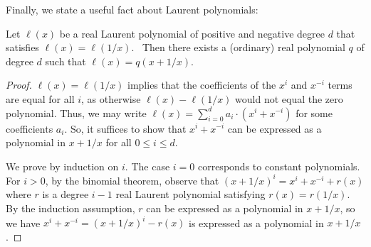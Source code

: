 Finally, we state a useful fact about Laurent polynomials:

\begin{lemma}
\label{lem:symmetric} Let $\ell (x)$ be a real Laurent polynomial of positive
and negative degree $d$ that satisfies $\ell (x)=\ell (1/x)$. \ Then there exists a (ordinary) real
polynomial $q$ of degree $d$ such that $\ell (x)=q(x+1/x)$.
\end{lemma}

\begin{proof}
$\ell(x) = \ell(1/x)$ implies that the coefficients of the $x^i$ and $x^{-i}$ terms are equal for all $i$, as otherwise $\ell(x) - \ell(1/x)$ would not equal the zero polynomial. Thus, we may write $\ell(x) = \sum_{i=0}^d a_i \cdot (x^i + x^{-i})$ for some coefficients $a_i$. So, it suffices to show that $x^i + x^{-i}$ can be expressed as a polynomial in $x + 1/x$ for all $0 \le i \le d$.

We prove by induction on $i$. The case $i = 0$ corresponds to constant polynomials. For $i > 0$, by the binomial theorem, observe that $(x + 1/x)^i = x^i + x^{-i} + r(x)$ where $r$ is a degree $i - 1$ real Laurent polynomial satisfying $r(x) = r(1/x)$. By the induction assumption, $r$ can be expressed as a polynomial in $x + 1/x$, so we have $x^i + x^{-i} = (x + 1/x)^i - r(x)$ is expressed as a polynomial in $x + 1/x$.
\end{proof}

%
